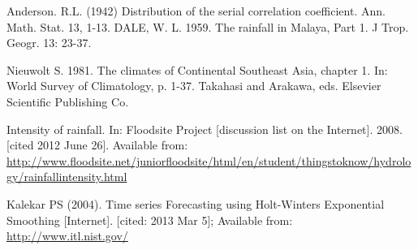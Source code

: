 \documentclass{pshscarc}\usepackage{graphicx, color}
\begin{document}
\begin{thebibliography}{99\kern\bibindent}
Anderson. R.L. (1942) Distribution of the serial correlation coefficient. Ann. Math. Stat. 13, 1-13.
DALE, W. L. 1959. The rainfall in Malaya, Part 1. J Trop. Geogr. 13: 23-37.

Nieuwolt S. 1981. The climates of Continental Southeast Asia, chapter 1. In: World Survey of Climatology, p. 1-37. Takahasi and Arakawa, eds. Elsevier Scientific Publishing Co.

Intensity of rainfall. In: Floodsite Project [discussion list on the Internet]. 2008. [cited 2012 June 26]. Available from: \url{http://www.floodsite.net/juniorfloodsite/html/en/student/thingstoknow/hydrology/rainfallintensity.html}

 Kalekar PS (2004). Time series Forecasting using Holt-Winters Exponential Smoothing [Internet]. [cited: 2013 Mar 5]; Available from: \url{http://www.itl.nist.gov/}
\end{thebibliography}

\appendix

\end{document}
